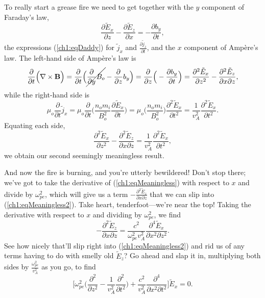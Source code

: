 To really start a grease fire we need to get together with the $y$ component of Faraday's law,
\begin{equation*}
  \dfrac{\partial \tilde E_x}{\partial z} - \dfrac{\partial \tilde E_z}{\partial x} = - \dfrac{\partial b_y}{\partial t},
\end{equation*}
the expressions (\ref{ch1:eqDaddy}) for $\tilde j_x$ and
$\frac{\partial \tilde j_z}{\partial t}$, and the $x$ component of Amp\`{e}re's law. The left-hand side of Amp\`{e}re's law is 
\begin{equation*}
  \dfrac{\partial}{\partial t} \Big ( {\bf \nabla} \times \mathbf{B} \Big ) = \dfrac{\partial}{\partial t} \Big ( \cancel{\dfrac{\partial}{\partial y} B_o} - \dfrac{\partial}{\partial z} b_y \Big ) = \dfrac{\partial}{\partial z} \Big ( - \dfrac{\partial b_y}{\partial t} \Big ) = \dfrac{\partial^2 \tilde E_x}{\partial z^2} - \dfrac{\partial^2 \tilde E_z}{\partial x \partial z},
\end{equation*}
while the right-hand side is 
\begin{equation*}
  \mu_o \dfrac{\partial}{\partial t} \tilde j_x = \mu_o \dfrac{\partial}{\partial t} \Big ( \dfrac{n_o m_i}{B_o^2} \dfrac{\partial \tilde E_x}{\partial t} \Big ) = \mu_o \Big ( \dfrac{n_o m_i}{B_o^2} \Big ) \dfrac{\partial^2 \tilde E_x}{\partial t^2} = \dfrac{1}{v_A^2} \dfrac{\partial^2 \tilde E_x}{\partial t^2}.
\end{equation*}
Equating each side, 
\begin{equation} \label{ch1:eqMeaningless2} \dfrac{\partial^2 \tilde
    E_x}{\partial z^2} - \dfrac{\partial^2 \tilde E_z}{\partial x \partial z} =
  \dfrac{1}{v_A^2} \dfrac{\partial^2 \tilde E_x}{\partial t^2},
\end{equation}
we obtain our second seemingly meaningless result.

And now the fire is burning, and you're utterly bewildered! Don't stop there;
we've got to take the derivative of (\ref{ch1:eqMeaningless}) with respect to
$x$ and divide by $\omega_{pe}^2$, which will give us a term
$-\frac{\partial^2 \tilde E_z}{\partial x \partial z}$ that we can slip into
(\ref{ch1:eqMeaningless2}). Take heart, tenderfoot---we're near the top! Taking
the derivative with respect to $x$ and dividing by $\omega_{pe}^2$, we find
\begin{equation*}
  -\dfrac{\partial^2 \tilde E_z}{\partial x \partial z} = \dfrac{c^2}{\omega_{pe}^2 v_A^2} \dfrac{\partial^4 \tilde E_x}{\partial x^2 \partial z^2}.
\end{equation*}
See how nicely that'll slip right into (\ref{ch1:eqMeaningless2}) and rid us of any terms having to do with smelly old $\tilde E_z$? Go
ahead and slap it in, multiplying both sides by $\frac{\omega_{pe}^2}{v_A^2}$ as you go, to find
\begin{equation} \label{ch1:eqAlmost}
  \Big [ \omega_{pe}^2 \Big ( \dfrac{\partial^2}{\partial z^2} - \dfrac{1}{v_A^2} \dfrac{\partial^2}{\partial t^2} \Big ) + \dfrac{c^2}{v_A^2} \dfrac{\partial^4}{\partial x^2 \partial t^2} \Big ] \tilde E_x = 0.
\end{equation}

